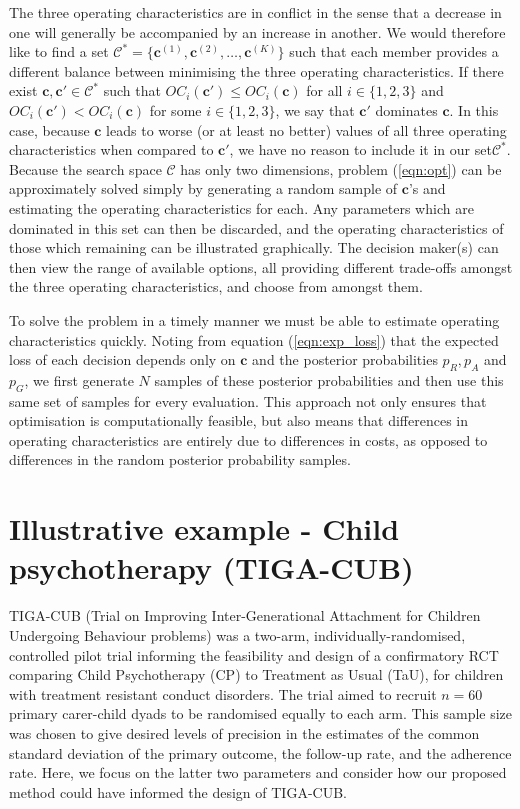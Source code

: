 \documentclass{article} %
\begin{document}
The three operating characteristics are in conflict in the sense that a decrease in one will generally be accompanied by an increase in another. We would therefore like to find a set $\mathcal{C}^* = \{ \mathbf{c}^{(1)}, \mathbf{c}^{(2)}, \ldots, \mathbf{c}^{(K)} \}$ such that each member provides a different balance between minimising the three operating characteristics. If there exist $\mathbf{c}, \mathbf{c}' \in \mathcal{C}^*$ such that $OC_i(\mathbf{c}') \leq OC_i(\mathbf{c})$ for all $i \in \{1, 2, 3\}$ and $OC_i(\mathbf{c}') < OC_i(\mathbf{c})$ for some $i \in \{1, 2, 3\}$, we say that $\mathbf{c}'$ dominates $\mathbf{c}$. In this case, because $\mathbf{c}$ leads to worse (or at least no better) values of all three operating characteristics when compared to $\mathbf{c}'$, we have no reason to include it in our set$\mathcal{C}^*$. Because the search space $\mathcal{C}$ has only two dimensions, problem (\ref{eqn:opt}) can be approximately solved simply by generating a random sample of $\mathbf{c}$'s and estimating the operating characteristics for each. Any parameters which are dominated in this set can then be discarded, and the operating characteristics of those which remaining can be illustrated graphically. The decision maker(s) can then view the range of available options, all providing different trade-offs amongst the three operating characteristics, and choose from amongst them. 

To solve the problem in a timely manner we must be able to estimate operating characteristics quickly. Noting from equation (\ref{eqn:exp_loss}) that the expected loss of each decision depends only on $\mathbf{c}$ and the posterior probabilities $p_R, p_A$ and $p_G$, we first generate $N$ samples of these posterior probabilities and then use this same set of samples for every evaluation. This approach not only ensures that optimisation is computationally feasible, but also means that differences in operating characteristics are entirely due to differences in costs, as opposed to differences in the random posterior probability samples.

\section{Illustrative example - Child psychotherapy (TIGA-CUB)}\label{sec:TIGA}

TIGA-CUB (Trial on Improving Inter-Generational Attachment for Children Undergoing Behaviour problems) was a two-arm, individually-randomised, controlled pilot trial informing the feasibility and design of a confirmatory RCT comparing Child Psychotherapy (CP) to Treatment as Usual (TaU), for children with
treatment resistant conduct disorders. The trial aimed to recruit $n=60$ primary carer-child dyads to be randomised equally to each arm. This sample size was chosen to give desired levels of precision in the estimates of the common standard deviation of the primary outcome, the follow-up rate, and the adherence rate. Here, we focus on the latter two parameters and consider how our proposed method could have informed the design of TIGA-CUB.
\end{document}
